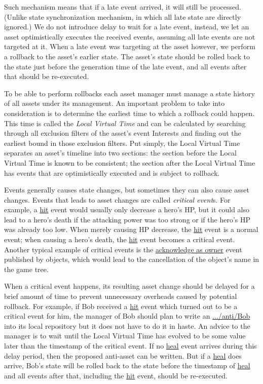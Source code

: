 \documentclass{sigchi}
\begin{document}
Such mechanism means that if a late event arrived, it will still be processed. (Unlike state synchronization mechanism, in which all late state are directly ignored.) We do not introduce delay to wait for a late event, instead, we let an asset optimistically executes the received events, assuming all late events are not targeted at it. When a late event was targeting at the asset however, we perform a rollback to the asset's earlier state. The asset's state should be rolled back to the state just before the generation time of the late event, and all events after that should be re-executed. 

To be able to perform rollbacks each asset manager must manage a state history of all assets under its management. An important problem to take into consideration is to determine the earliest time to which a rollback could happen. This time is called the \emph{Local Virtual Time} and can be calculated by searching through all exclusion filters of the asset's event Interests and finding out the earliest bound in those exclusion filters. Put simply, the Local Virtual Time separates an asset's timeline into two sections: the section before the Local Virtual Time is known to be consistent; the section after the Local Virtual Time has events that are optimistically executed and is subject to rollback.

Events generally causes state changes, but sometimes they can also cause asset changes. Events that leads to asset changes are called \emph{critical event}s. For example, a \url{hit} event would usually only decrease a hero's HP, but it could also lead to a hero's death if the attacking power was too strong or if the hero's HP was already too low. When merely causing HP decrease, the \url{hit} event is a normal event; when causing a hero's death, the \url{hit} event becomes a critical event. Another typical example of critical events is the \url{acknowledge as owner} event published by objects, which would lead to the cancellation of the object's name in the game tree. 

When a critical event happens, its resulting asset change should be delayed for a brief amount of time to prevent unnecessary overheads caused by potential rollback. For example, if Bob received a \url{hit} event which turned out to be a critical event for him, the manager of Bob should plan to write an \url{.../anti/Bob} into its local repository but it does not have to do it in haste. An advice to the manager is to wait until the Local Virtual Time has evolved to be some value later than the timestamp of the critical event. If no \url{heal} event arrives during this delay period, then the proposed anti-asset can be written. But if a \url{heal} does arrive, Bob's state will be rolled back to the state before the timestamp of \url{heal} and all events after that, including the \url{hit} event, should be re-executed.
\end{document}
